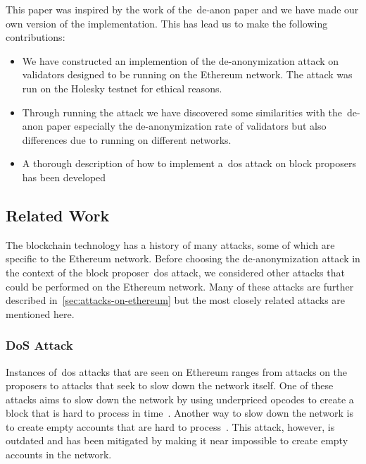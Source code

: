 This paper was inspired by the work of the~\gls{de-anon paper} and we have made our own version of the implementation.
This has lead us to make the following contributions:
\begin{itemize}
    \item We have constructed an implemention of the de-anonymization attack on validators designed to be running on the Ethereum network.
    The attack was run on the Holesky testnet for ethical reasons.
    \item Through running the attack we have discovered some similarities with the~\gls{de-anon paper} especially the de-anonymization rate of validators but also differences due to running on different networks.
    \item A thorough description of how to implement a~\gls{dos} attack on block proposers has been developed 
\end{itemize}

\subsection{Related Work}\label{subsec:related-work}
The blockchain technology has a history of many attacks, some of which are specific to the Ethereum network.
Before choosing the de-anonymization attack in the context of the block proposer~\gls{dos} attack, we considered other attacks that could be performed on the Ethereum network.
Many of these attacks are further described in~\autoref{sec:attacks-on-ethereum} but the most closely related attacks are mentioned here.


\subsubsection{DoS Attack}\label{subsubsec:dos-attack}
Instances of~\gls{dos} attacks that are seen on Ethereum ranges from attacks on the proposers to attacks that seek to slow down the network itself.
One of these attacks aims to slow down the network by using underpriced opcodes to create a block that is hard to process in time~\cite{10.1145/3391195,9815256}.
Another way to slow down the network is to create empty accounts that are hard to process~\cite{empty-account-mitigation,empty-account-eip-mitigation}.
This attack, however, is outdated and has been mitigated by making it near impossible to create empty accounts in the network.

